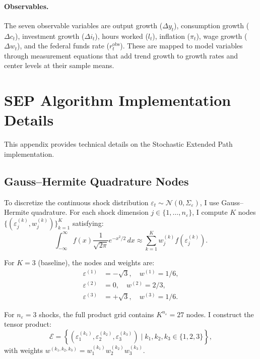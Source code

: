 \documentclass[12pt]{article}
\theoremstyle{plain}
\theoremstyle{definition}
\theoremstyle{remark}
\newcommand{\eps}{\varepsilon}
\begin{document}
\paragraph{Observables.} The seven observable variables are output growth ($\Delta y_t$), consumption growth ($\Delta c_t$), investment growth ($\Delta i_t$), hours worked ($l_t$), inflation ($\pi_t$), wage growth ($\Delta w_t$), and the federal funds rate ($r_t^{\text{obs}}$). These are mapped to model variables through measurement equations that add trend growth to growth rates and center levels at their sample means.


\section{SEP Algorithm Implementation Details}
\label{app:sep}

This appendix provides technical details on the Stochastic Extended Path implementation.


\subsection{Gauss--Hermite Quadrature Nodes}

To discretize the continuous shock distribution $\eps_t \sim \mathcal{N}(0, \Sigma_\eps)$, I use Gauss--Hermite quadrature. For each shock dimension $j \in \{1, \ldots, n_\eps\}$, I compute $K$ nodes $\{(\eps_j^{(k)}, w_j^{(k)})\}_{k=1}^K$ satisfying:
\begin{equation}
\int_{-\infty}^\infty f(x) \frac{1}{\sqrt{2\pi}} e^{-x^2/2} \, dx \approx \sum_{k=1}^K w_j^{(k)} f(\eps_j^{(k)}).
\end{equation}

For $K=3$ (baseline), the nodes and weights are:
\begin{align}
\eps^{(1)} &= -\sqrt{3}, \quad w^{(1)} = 1/6, \\
\eps^{(2)} &= 0, \quad w^{(2)} = 2/3, \\
\eps^{(3)} &= +\sqrt{3}, \quad w^{(3)} = 1/6.
\end{align}

For $n_\eps=3$ shocks, the full product grid contains $K^{n_\eps} = 27$ nodes. I construct the tensor product:
\begin{equation}
\mathcal{E} = \left\{ (\eps_1^{(k_1)}, \eps_2^{(k_2)}, \eps_3^{(k_3)}) \mid k_1, k_2, k_3 \in \{1,2,3\} \right\},
\end{equation}
with weights $w^{(k_1,k_2,k_3)} = w_1^{(k_1)} w_2^{(k_2)} w_3^{(k_3)}$.
\end{document}
